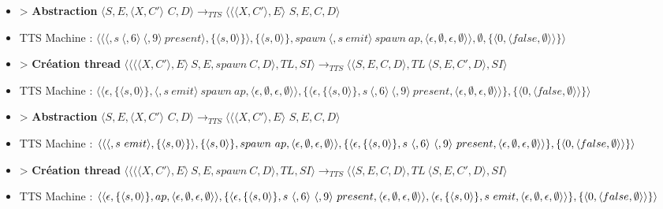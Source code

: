 \documentclass[10pt,a4paper]{article}
\begin{document}
\begin{itemize}
					\item[] > \textbf{Abstraction} 	$\langle S,E,\langle X,C'\rangle$ $C,D\rangle
					\longrightarrow_{TTS} 
					\langle \langle\langle X,C'\rangle,E\rangle$ $S,E,C,D\rangle$
					\item[] TTS Machine : $\langle \langle\langle ,s~\langle,6\rangle~\langle,9\rangle~present\rangle,\{\langle s,0\rangle\}\rangle,\{\langle s,0\rangle\},spawn~\langle ,s~emit\rangle~spawn~ap,\langle \epsilon,\emptyset,\epsilon,\emptyset\rangle\rangle,\emptyset,\{\langle 0,\langle false,\emptyset\rangle\rangle\}\rangle$ 
					\item[] > \textbf{Création thread} $\langle\langle\langle\langle X,C'\rangle, E\rangle~S,E,spawn~C,D\rangle,TL,SI\rangle 
					\longrightarrow_{TTS} 
					\langle\langle S,E,C,D\rangle,TL~\langle S,E,C',D\rangle,SI\rangle$
					\item[] TTS Machine : $\langle\langle\epsilon,\{\langle s,0\rangle\},\langle ,s~emit\rangle~spawn~ap,\langle \epsilon,\emptyset,\epsilon,\emptyset\rangle\rangle,\{\langle\epsilon,\{\langle s,0\rangle\},s~\langle,6\rangle~\langle,9\rangle~present,\langle \epsilon,\emptyset,\epsilon,\emptyset\rangle\rangle\},\{\langle 0,\langle false,\emptyset\rangle\rangle\}\rangle$ 
					\item[] > \textbf{Abstraction} 	$\langle S,E,\langle X,C'\rangle$ $C,D\rangle
					\longrightarrow_{TTS} 
					\langle \langle\langle X,C'\rangle,E\rangle$ $S,E,C,D\rangle$
					\item[] TTS Machine : $\langle \langle\langle ,s~emit\rangle,\{\langle s,0\rangle\}\rangle,\{\langle s,0\rangle\},spawn~ap,\langle \epsilon,\emptyset,\epsilon,\emptyset\rangle\rangle,\{\langle\epsilon,\{\langle s,0\rangle\},s~\langle,6\rangle~\langle,9\rangle~present,\langle \epsilon,\emptyset,\epsilon,\emptyset\rangle\rangle\}\\,\{\langle 0,\langle false,\emptyset\rangle\rangle\}\rangle$ 
					\item[] > \textbf{Création thread} $\langle\langle\langle\langle X,C'\rangle, E\rangle~S,E,spawn~C,D\rangle,TL,SI\rangle 
					\longrightarrow_{TTS} 
					\langle\langle S,E,C,D\rangle,TL~\langle S,E,C',D\rangle,SI\rangle$
					\item[] TTS Machine : $\langle\langle\epsilon,\{\langle s,0\rangle\},ap,\langle \epsilon,\emptyset,\epsilon,\emptyset\rangle\rangle,\{\langle\epsilon,\{\langle s,0\rangle\},s~\langle,6\rangle~\langle,9\rangle~present,\langle \epsilon,\emptyset,\epsilon,\emptyset\rangle\rangle,\langle\epsilon,\{\langle s,0\rangle\},s~emit,\langle \epsilon,\emptyset,\epsilon,\emptyset\rangle\rangle\}\\,\{\langle 0,\langle false,\emptyset\rangle\rangle\}\rangle$ 

\end{itemize}
\end{document}
